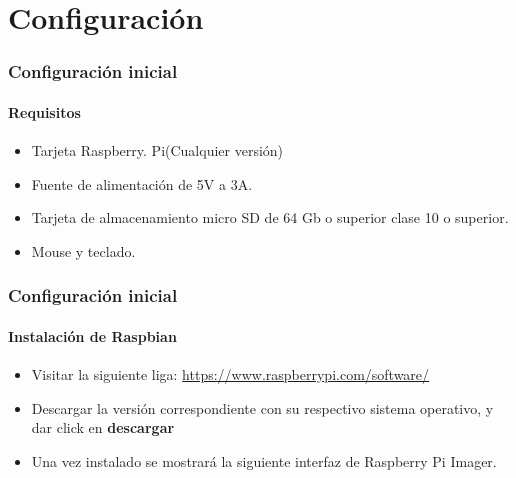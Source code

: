 \documentclass{beamer}
\begin{document}
	\section{Configuración}
	\begin{frame}
		\frametitle{Configuración inicial}
		\framesubtitle{Requisitos}
		
		\begin{tcolorbox}[enhanced, title= Material necesario:]
			\begin{itemize}
				\item Tarjeta Raspberry. Pi(Cualquier versión)
				\item Fuente de alimentación de 5V a 3A.
				\item Tarjeta de almacenamiento micro SD de 64 Gb o superior clase 10 o superior.
				\item Mouse y teclado.
			\end{itemize}
		\end{tcolorbox}
		
			
	\end{frame}

	\begin{frame}
		\frametitle{Configuración inicial}
		\framesubtitle{Instalación de Raspbian}
		
		\begin{tcolorbox}[enhanced, title= Instrucciones:]
				\begin{itemize}
					\item Visitar la siguiente liga: \url{https://www.raspberrypi.com/software/}
					\item Descargar la versión correspondiente con su respectivo sistema operativo, y dar click en \textbf{descargar}
					\item Una vez instalado se mostrará la siguiente interfaz de Raspberry Pi Imager.
				\end{itemize}
		\end{tcolorbox}
		
		
	\end{frame}
	
\end{document}

